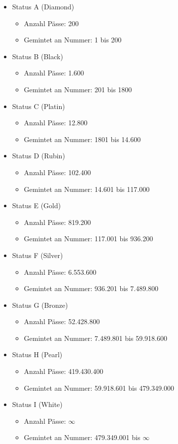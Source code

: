 \begin{NFT-Prop}
\begin{itemize}
    \item Status A (Diamond)
    \begin{itemize}
    	\item Anzahl Pässe: 200
    	\item Gemintet an Nummer: 1 bis 200
    \end{itemize}
    \item Status B (Black)
    \begin{itemize}
    	\item Anzahl Pässe: 1.600
    	\item Gemintet an Nummer: 201 bis 1800
    \end{itemize}
    \item Status C (Platin)
    \begin{itemize}
    	\item Anzahl Pässe: 12.800
    	\item Gemintet an Nummer: 1801 bis 14.600
    \end{itemize}
    \item Status D (Rubin)
    \begin{itemize}
    	\item Anzahl Pässe: 102.400
    	\item Gemintet an Nummer: 14.601 bis 117.000
    \end{itemize}
    \item Status E (Gold)
    \begin{itemize}
    	\item Anzahl Pässe: 819.200
    	\item Gemintet an Nummer: 117.001 bis 936.200
    \end{itemize}
    \item Status F (Silver)
    \begin{itemize}
    	\item Anzahl Pässe: 6.553.600
    	\item Gemintet an Nummer: 936.201 bis 7.489.800
    \end{itemize}
    \item Status G (Bronze)
    \begin{itemize}
    	\item Anzahl Pässe: 52.428.800
    	\item Gemintet an Nummer: 7.489.801 bis 59.918.600
    \end{itemize}
    \item Status H (Pearl)
    \begin{itemize}
    	\item Anzahl Pässe: 419.430.400
    	\item Gemintet an Nummer: 59.918.601 bis 479.349.000
    \end{itemize}
    \item Status I (White)
    \begin{itemize}
    	\item Anzahl Pässe: $\infty$
    	\item Gemintet an Nummer: 479.349.001 bis $\infty$
    \end{itemize}
\end{itemize}


\end{NFT-Prop}
